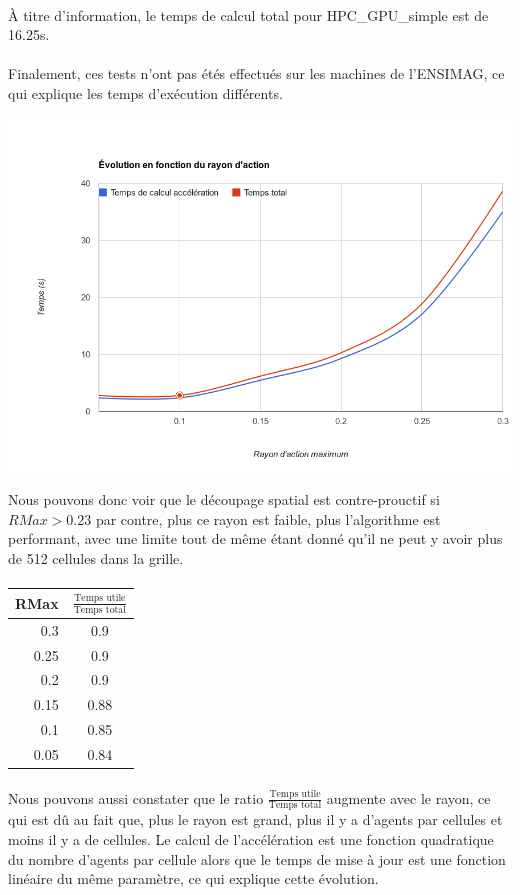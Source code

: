 \documentclass[liens,entete-ensimag,margeCorrection]{ensirapport}
\begin{document}
\paragraph{}
À titre d'information, le temps de calcul total pour HPC\_GPU\_simple est de 16.25s.
\paragraph{}
Finalement, ces tests n'ont pas étés effectués sur les machines de l'ENSIMAG, ce qui explique les temps d'exécution différents.

\includegraphics[width=\linewidth]{RadiusPerf}

Nous pouvons donc voir que le découpage spatial est contre-prouctif si $RMax > 0.23$ par contre, plus ce rayon est faible, plus l'algorithme est performant, avec une limite tout de même étant donné qu'il ne peut y avoir plus de 512 cellules dans la grille.
\paragraph{}
\begin{tabular}{|r|c|}
	\hline
	RMax & $\frac{\text{Temps utile}}{\text{Temps total}}$ \\
	\hline
	0.3 & 0.9 \\
	\hline
	0.25 & 0.9 \\
	\hline
	0.2 & 0.9 \\
	\hline
	0.15 & 0.88 \\
	\hline
	0.1 & 0.85 \\
	\hline
	0.05 & 0.84 \\
	\hline
\end{tabular}
\paragraph{}
Nous pouvons aussi constater que le ratio $\frac{\text{Temps utile}}{\text{Temps total}}$ augmente avec le rayon, ce qui est dû au fait que, plus le rayon est grand, plus il y a d'agents par cellules et moins il y a de cellules. Le calcul de l'accélération est une fonction quadratique du nombre d'agents par cellule alors que le temps de mise à jour est une fonction linéaire du même paramètre, ce qui explique cette évolution.
\end{document}
